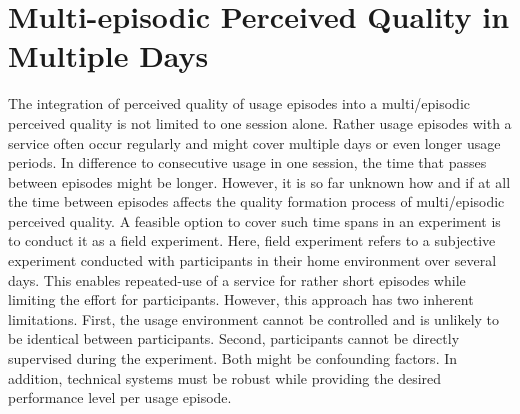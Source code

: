 

\chapter{Multi-episodic Perceived Quality in Multiple Days}\label{chap:field}
%
%
%



The integration of perceived quality of usage episodes into a multi\-/episodic perceived quality is not limited to one session alone.
Rather usage episodes with a service often occur regularly and might cover multiple days or even longer usage periods.
In difference to consecutive usage in one session, the time that passes between episodes might be longer.
However, it is so far unknown how and if at all the time between episodes affects the quality formation process of multi\-/episodic perceived quality.
A feasible option to cover such time spans in an experiment is to conduct it as a field experiment.
Here, field experiment refers to a subjective experiment conducted with participants in their home environment over several days.
This enables repeated-use of a service for rather short episodes while limiting the effort for participants.
However, this approach has two inherent limitations.
First, the usage environment cannot be controlled and is unlikely to be identical between participants.
Second, participants cannot be directly supervised during the experiment.
Both might be confounding factors.
In addition, technical systems must be robust while providing the desired performance level per usage episode.

